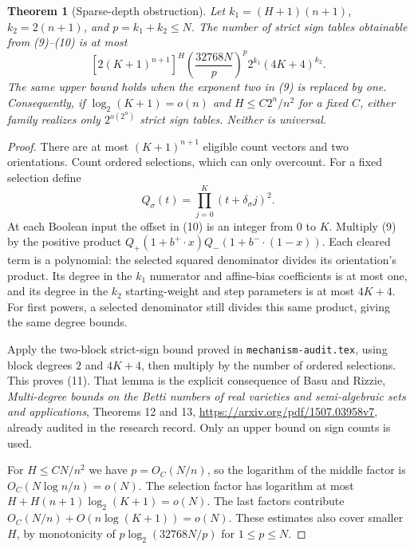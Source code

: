 \documentclass[11pt]{article}
\newtheorem{theorem}{Theorem}
\begin{document}
\begin{theorem}[Sparse-depth obstruction]
Let $k_1=(H+1)(n+1)$, $k_2=2(n+1)$, and $p=k_1+k_2\le N$.
The number of strict sign tables obtainable from (9)--(10) is at most
\[
 \left[2(K+1)^{n+1}\right]^H
 \left(\frac{32768N}{p}\right)^p
 2^{k_1}(4K+4)^{k_2}.
 \tag{11}
\]
The same upper bound holds when the exponent two in (9) is replaced
by one. Consequently, if $\log_2(K+1)=o(n)$ and
$H\le C2^n/n^2$ for a fixed $C$, either family realizes only
$2^{o(2^n)}$ strict sign tables. Neither is universal.
\end{theorem}
\begin{proof}
There are at most $(K+1)^{n+1}$ eligible count vectors and two
orientations. Count ordered selections, which can only overcount.
For a fixed selection define
\[
 Q_\sigma(t)=\prod_{j=0}^K(t+\delta_\sigma j)^2.
\]
At each Boolean input the offset in (10) is an integer from $0$ to
$K$. Multiply (9) by the positive product
$Q_+(1+b^+\cdot x)Q_-(1+b^-\cdot(1-x))$.
Each cleared term is a polynomial: the selected squared denominator
divides its orientation's product. Its degree in the $k_1$ numerator
and affine-bias coefficients is at most one, and its degree in the
$k_2$ starting-weight and step parameters is at most $4K+4$.
For first powers, a selected denominator still divides this same
product, giving the same degree bounds.

Apply the two-block strict-sign bound proved in
\texttt{mechanism-audit.tex}, using block degrees $2$ and $4K+4$,
then multiply by the number of ordered selections. This proves (11).
That lemma is the explicit consequence of Basu and Rizzie,
\emph{Multi-degree bounds on the Betti numbers of real varieties
and semi-algebraic sets and applications}, Theorems 12 and 13,
\url{https://arxiv.org/pdf/1507.03958v7}, already audited in the
research record. Only an upper bound on sign counts is used.

For $H\le CN/n^2$ we have $p=O_C(N/n)$, so the logarithm of the
middle factor is $O_C(N\log n/n)=o(N)$. The selection factor has
logarithm at most $H+H(n+1)\log_2(K+1)=o(N)$. The last factors
contribute $O_C(N/n)+O(n\log(K+1))=o(N)$. These estimates also
cover smaller $H$, by monotonicity of $p\log_2(32768N/p)$ for
$1\le p\le N$.
\end{proof}
\end{document}
